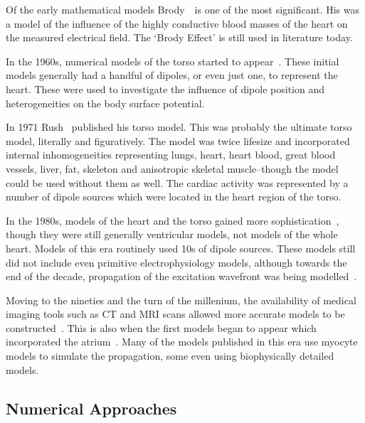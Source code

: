 Of the early mathematical models Brody~\cite{Brody1956}\ is one of the most
significant.
His was a model of the influence of the highly conductive blood masses of the
heart on the measured electrical field.
The `Brody Effect' is still used in literature today.

In the 1960s, numerical models of the torso started to
appear~\cite{Barr1966,Barnard1967}.
These initial models generally had a handful of dipoles, or even just one, to
represent the heart.
These were used to investigate the influence of dipole position and
heterogeneities on the body surface potential.

In 1971 Rush~\cite{Rush1971} published his torso model.
This was probably the ultimate torso model, literally and figuratively.
The model was twice lifesize and incorporated internal inhomogeneities
representing lungs, heart, heart blood, great blood vessels, liver, fat,
skeleton and anisotropic skeletal muscle--though the model could be used without
them as well.
The cardiac activity was represented by a number of dipole sources which were
located in the heart region of the torso.

In the 1980s, models of the heart and the torso gained more
sophistication~\cite{Gulrajani1983,Horacek1987}, though they were still generally
ventricular models, not models of the whole heart.
Models of this era routinely used 10s of dipole sources.
These models still did not include even primitive electrophysiology models,
although towards the end of the decade, propagation of the excitation wavefront
was being modelled~\cite{Aoki1987}.

Moving to the nineties and the turn of the millenium, the availability of
medical imaging tools such as CT and MRI scans allowed more accurate models to
be constructed~\cite{Weixue1993,Weixue1996}.
This is also when the first models began to appear which incorporated the
atrium~\cite{Weixue1996,vanDam2005}.
Many of the models published in this era use myocyte models to simulate the
propagation, some even using biophysically detailed models.

\subsection{Numerical Approaches}
\label{sec:intro:forward:numerical}

